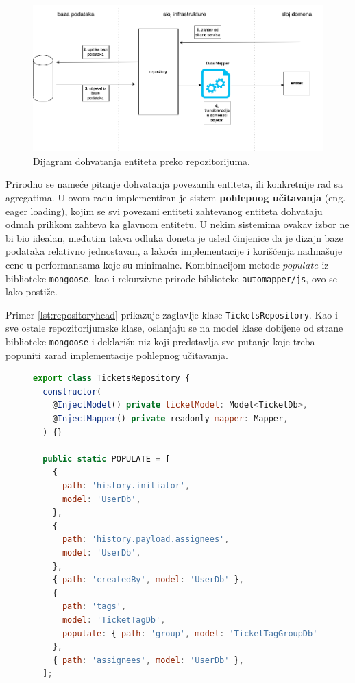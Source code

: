 \documentclass[12pt,oneside]{memoir}
\begin{document}
\begin{figure}[h]
  \centering
  \includegraphics[width=1\textwidth]{docs/images/ch_2/repository.drawio.png} 
  \caption{Dijagram dohvatanja entiteta preko repozitorijuma.}
  \label{fig:sample}
\end{figure}

Prirodno se nameće pitanje dohvatanja povezanih entiteta, ili konkretnije rad sa agregatima. U ovom radu implementiran je sistem \textbf{pohlepnog učitavanja} (eng. eager loading), kojim se svi povezani entiteti zahtevanog entiteta dohvataju odmah prilikom zahteva ka glavnom entitetu. U nekim sistemima ovakav izbor ne bi bio idealan, međutim takva odluka doneta je usled činjenice da je dizajn baze podataka relativno jednostavan, a lakoća implementacije i korišćenja nadmašuje cene u performansama koje su minimalne. Kombinacijom metode $populate$ 
 iz biblioteke \verb|mongoose|, kao i rekurzivne prirode biblioteke \verb|automapper/js|, ovo se lako postiže.

Primer \ref{lst:repositoryhead} prikazuje zaglavlje klase \verb|TicketsRepository|. Kao i sve ostale repozitorijumske klase, oslanjaju se na model klase dobijene od strane biblioteke \verb|mongoose| i deklarišu niz koji predstavlja sve putanje koje treba popuniti zarad implementacije pohlepnog učitavanja.

\begin{figure}[h]
\begin{lstlisting}[language=JavaScript, style=ES6, caption={Repozitorijum kartica, konstrukcija i niz POPULATE.}, label={lst:repositoryhead}]
export class TicketsRepository {
  constructor(
    @InjectModel() private ticketModel: Model<TicketDb>,
    @InjectMapper() private readonly mapper: Mapper,
  ) {}

  public static POPULATE = [
    {
      path: 'history.initiator',
      model: 'UserDb',
    },
    {
      path: 'history.payload.assignees',
      model: 'UserDb',
    },
    { path: 'createdBy', model: 'UserDb' },
    {
      path: 'tags',
      model: 'TicketTagDb',
      populate: { path: 'group', model: 'TicketTagGroupDb' },
    },
    { path: 'assignees', model: 'UserDb' },
  ];
\end{lstlisting}
\end{figure}
\end{document}
